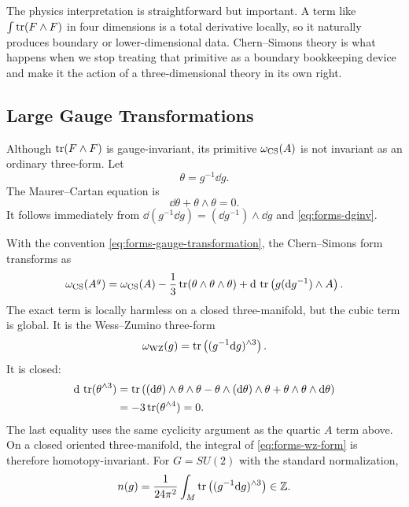 The physics interpretation is straightforward but important. A term like $\int\operatorname{tr}(F\wedge F)$ in four dimensions is a total derivative locally, so it naturally produces boundary or lower-dimensional data. Chern--Simons theory is what happens when we stop treating that primitive as a boundary bookkeeping device and make it the action of a three-dimensional theory in its own right.

\subsection{Large Gauge Transformations}
\label{subsec:cs-gauge-transformation}

Although $\operatorname{tr}(F\wedge F)$ is gauge-invariant, its primitive $\omega_{\operatorname{CS}}(A)$ is not invariant as an ordinary three-form. Let
\begin{equation}
  \theta=g^{-1}\dd g.
  \label{eq:forms-maurer-cartan-form}
\end{equation}
The Maurer--Cartan equation is
\begin{equation}
  \dd\theta+\theta\wedge\theta=0.
  \label{eq:forms-maurer-cartan}
\end{equation}
It follows immediately from $\dd(g^{-1}\dd g)=(\dd g^{-1})\wedge\dd g$ and \eqref{eq:forms-dginv}.

With the convention \eqref{eq:forms-gauge-transformation}, the Chern--Simons form transforms as
\begin{equation}
  \omega_{\operatorname{CS}}(A^g)
  =
  \omega_{\operatorname{CS}}(A)
  -
  \frac13\operatorname{tr}(\theta\wedge\theta\wedge\theta)
  +
  \mathrm{d}\,\operatorname{tr}\left(g(\mathrm{d} g^{-1})\wedge A\right).
  \label{eq:forms-cs-gauge-law}
\end{equation}
The exact term is locally harmless on a closed three-manifold, but the cubic term is global. It is the Wess--Zumino three-form
\begin{equation}
  \omega_{\mathrm{WZ}}(g)
  =
  \operatorname{tr}\left((g^{-1}\mathrm{d} g)^{\wedge 3}\right).
  \label{eq:forms-wz-form}
\end{equation}
It is closed:
\begin{align}
  \mathrm{d}\,\operatorname{tr}(\theta^{\wedge 3})
  &=
  \operatorname{tr}\left((\mathrm{d}\theta)\wedge\theta\wedge\theta
  -\theta\wedge(\mathrm{d}\theta)\wedge\theta
  +\theta\wedge\theta\wedge\mathrm{d}\theta\right)
  \notag\\
  &=
  -3\operatorname{tr}(\theta^{\wedge 4})
  =
  0.
  \label{eq:forms-wz-closed}
\end{align}
The last equality uses the same cyclicity argument as the quartic $A$ term above. On a closed oriented three-manifold, the integral of \eqref{eq:forms-wz-form} is therefore homotopy-invariant. For $G=SU(2)$ with the standard normalization,
\begin{equation}
  n(g)
  =
  \frac{1}{24\pi^2}
  \int_M \operatorname{tr}\left((g^{-1}\mathrm{d} g)^{\wedge 3}\right)
  \in\mathbb Z.
  \label{eq:forms-winding-number}
\end{equation}

